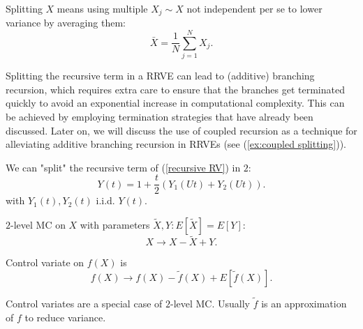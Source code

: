 \documentclass[a4paper,12pt]{article}
\begin{document}
\begin{definition}[splitting] \label{def:splitting}
    Splitting $X$ means using multiple $X_{j} \sim X$ not independent per se to
    lower variance by averaging them:
    \begin{equation}
        \bar{X}= \frac{1}{N} \sum_{j=1}^{N} X_{j}.
    \end{equation}
\end{definition}

Splitting the recursive term in a RRVE can lead to (additive) branching recursion,
which requires extra care to ensure that the branches get terminated quickly to avoid
an exponential increase in computational complexity. This can be achieved by employing
termination strategies that have already been discussed. Later on, we will discuss
the use of coupled recursion as a technique for alleviating additive branching
recursion in RRVEs (see (\ref{ex:coupled splitting})).

\begin{example}
    We can "split" the recursive term of  (\ref{recursive RV}) in $2$:
    \begin{equation}
        Y(t) = 1 + \frac{t}{2}(Y_{1}(Ut)+Y_{2}(Ut)).
    \end{equation}
    with $Y_{1}(t),Y_{2}(t)$ i.i.d. $Y(t)$.
\end{example}

\vspace{0.2cm}

\begin{pythonn}
\end{pythonn}

\begin{definition}[$2$-level MC] \label{2 level}
    $2$-level MC on $X$ with parameters $\tilde{X}, Y: E[\tilde{X}]=E[Y]$:
    \begin{equation}
        X \rightarrow X-\tilde{X} + Y.
    \end{equation}
\end{definition}

\begin{definition} \label{CV}
    Control variate on $f(X)$ is
    \begin{equation}
        f(X) \rightarrow f(X)-\tilde{f}(X) + E[\tilde{f}(X)].
    \end{equation}
\end{definition}
Control variates are a special case of $2$-level MC. Usually $\tilde{f}$ is an approximation
of $f$ to reduce variance.
\end{document}
